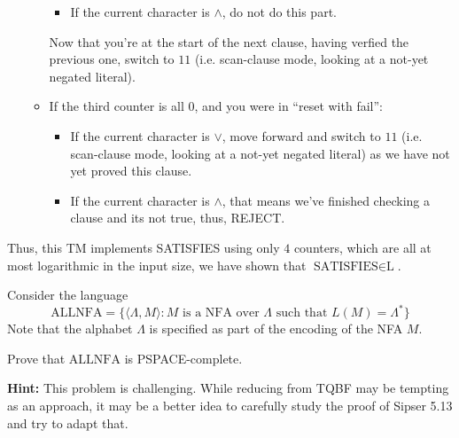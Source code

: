 \documentclass[12pt]{article}
\begin{document}
\begin{solution}
\begin{enumerate}
\begin{itemize}
\begin{itemize}
                \item If the current character is $\land$, do not do this part. 
            \end{itemize} 
            Now that you're at the start of the next clause, having verfied the previous one, switch to $11$ (i.e. scan-clause mode, looking at a not-yet negated literal).
            \item If the third counter is all $0$, and you were in ``reset with fail'':
            \begin{itemize}
                \item If the current character is $\lor$, move forward and switch to $11$ (i.e. scan-clause mode, looking at a not-yet negated literal) as we have not yet proved this clause. 
                \item If the current character is $\land$, that means we've finished checking a clause and its not true, thus, REJECT.
            \end{itemize}   
        \end{itemize}
    \end{enumerate}
    Thus, this TM implements SATISFIES using only $4$ counters, which are all at most logarithmic in the input size, we have shown that $\text{SATISFIES} \in \text{L}$. 


    
\end{solution}

\newpage

\begin{problem}{4}
Consider the language
\[\text{ALLNFA} = \{\langle \Lambda, M \rangle : M \text{ is a NFA over } \Lambda \text{ such that } L(M) = \Lambda^* \}\]
Note that the alphabet $\Lambda$ is specified as part of the encoding of the NFA $M$.

Prove that $\text{ALLNFA}$ is PSPACE-complete.

\textbf{Hint:} This problem is challenging. While reducing from TQBF may be tempting as an approach, it may be a better idea to carefully study the proof of Sipser 5.13 and try to adapt that.
\end{problem}
\end{document}
